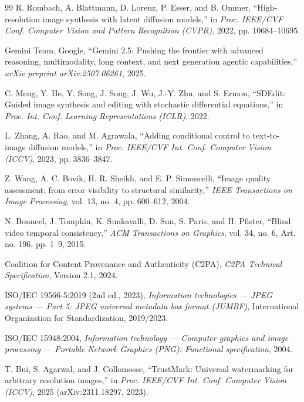 \documentclass[conference,10pt]{IEEEtran}
\begin{document}
\begin{thebibliography}{99}
R. Rombach, A. Blattmann, D. Lorenz, P. Esser, and B. Ommer, ``High-resolution image synthesis with latent diffusion models,'' in \emph{Proc. IEEE/CVF Conf. Computer Vision and Pattern Recognition (CVPR)}, 2022, pp. 10684--10695.

{Gemini Team, Google}, ``Gemini 2.5: Pushing the frontier with advanced reasoning, multimodality, long context, and next generation agentic capabilities,'' \emph{arXiv preprint arXiv:2507.06261}, 2025.

C. Meng, Y. He, Y. Song, J. Song, J. Wu, J.-Y. Zhu, and S. Ermon, ``SDEdit: Guided image synthesis and editing with stochastic differential equations,'' in \emph{Proc. Int. Conf. Learning Representations (ICLR)}, 2022.

L. Zhang, A. Rao, and M. Agrawala, ``Adding conditional control to text-to-image diffusion models,'' in \emph{Proc. IEEE/CVF Int. Conf. Computer Vision (ICCV)}, 2023, pp. 3836--3847.

Z. Wang, A. C. Bovik, H. R. Sheikh, and E. P. Simoncelli, ``Image quality assessment: from error visibility to structural similarity,'' \emph{IEEE Transactions on Image Processing}, vol. 13, no. 4, pp. 600--612, 2004.

N. Bonneel, J. Tompkin, K. Sunkavalli, D. Sun, S. Paris, and H. Pfister, ``Blind video temporal consistency,'' \emph{ACM Transactions on Graphics}, vol. 34, no. 6, Art. no. 196, pp. 1--9, 2015.

Coalition for Content Provenance and Authenticity (C2PA), \emph{C2PA Technical Specification}, Version 2.1, 2024.

ISO/IEC 19566-5:2019 (2nd ed., 2023), \emph{Information technologies --- JPEG systems --- Part 5: JPEG universal metadata box format (JUMBF)}, International Organization for Standardization, 2019/2023.

ISO/IEC 15948:2004, \emph{Information technology --- Computer graphics and image processing --- Portable Network Graphics (PNG): Functional specification}, 2004.

T. Bui, S. Agarwal, and J. Collomosse, ``TrustMark: Universal watermarking for arbitrary resolution images,'' in \emph{Proc. IEEE/CVF Int. Conf. Computer Vision (ICCV)}, 2025 (arXiv:2311.18297, 2023).


\end{thebibliography}
\end{document}

